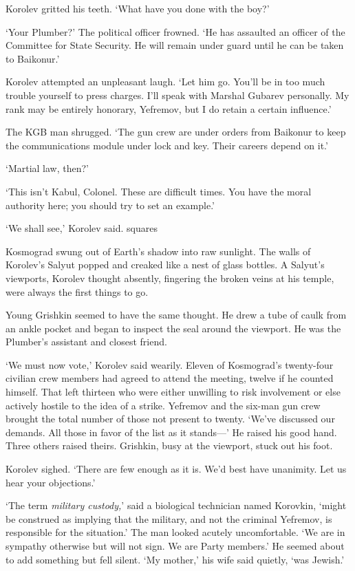 Korolev gritted his teeth. `What have you done with the boy?'

`Your Plumber?' The political officer frowned. `He has assaulted an officer of the Committee for State Security. He will remain under guard until he can be taken to Baikonur.'

Korolev attempted an unpleasant laugh. `Let him go. You'll be in too much trouble yourself to press charges. I'll speak with Marshal Gubarev personally. My rank may be entirely honorary, Yefremov, but I do retain a certain influence.'

The KGB man shrugged. `The gun crew are under orders from Baikonur to keep the communications module under lock and key. Their careers depend on it.'

`Martial law, then?'

`This isn't Kabul, Colonel. These are difficult times. You have the moral authority here; you should try to set an example.'

`We shall see,' Korolev said.
squares

Kosmograd swung out of Earth's shadow into raw sunlight. The walls of Korolev's Salyut popped and creaked like a nest of glass bottles. A Salyut's viewports, Korolev thought absently, fingering the broken veins at his temple, were always the first things to go.

Young Grishkin seemed to have the same thought. He drew a tube of caulk from an ankle pocket and began to inspect the seal around the viewport. He was the Plumber's assistant and closest friend.

`We must now vote,' Korolev said wearily. Eleven of Kosmograd's twenty-four civilian crew members had agreed to attend the meeting, twelve if he counted himself. That left thirteen who were either unwilling to risk involvement or else actively hostile to the idea of a strike. Yefremov and the six-man gun crew brought the total number of those not present to twenty. `We've discussed our demands. All those in favor of the list as it stands---' He raised his good hand. Three others raised theirs. Grishkin, busy at the viewport, stuck out his foot.

Korolev sighed. `There are few enough as it is. We'd best have unanimity. Let us hear your objections.'

`The term \textit{military custody,}' said a biological technician named Korovkin, `might be construed as implying that the military, and not the criminal Yefremov, is responsible for the situation.' The man looked acutely uncomfortable. `We are in sympathy otherwise but will not sign. We are Party members.' He seemed about to add something but fell silent. `My mother,' his wife said quietly, `was Jewish.'

